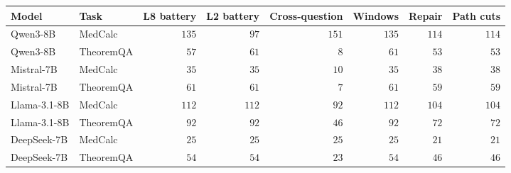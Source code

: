 \begin{tabular*}{\textwidth}{@{\extracolsep{\fill}}llrrrrrr@{}}
\toprule
Model & Task & L8 battery & L2 battery & Cross-question & Windows & Repair & Path cuts \\
\midrule
Qwen3-8B & MedCalc & $135$ & $97$ & $151$ & $135$ & $114$ & $114$ \\
Qwen3-8B & TheoremQA & $57$ & $61$ & $8$ & $61$ & $53$ & $53$ \\
Mistral-7B & MedCalc & $35$ & $35$ & $10$ & $35$ & $38$ & $38$ \\
Mistral-7B & TheoremQA & $61$ & $61$ & $7$ & $61$ & $59$ & $59$ \\
Llama-3.1-8B & MedCalc & $112$ & $112$ & $92$ & $112$ & $104$ & $104$ \\
Llama-3.1-8B & TheoremQA & $92$ & $92$ & $46$ & $92$ & $72$ & $72$ \\
DeepSeek-7B & MedCalc & $25$ & $25$ & $25$ & $25$ & $21$ & $21$ \\
DeepSeek-7B & TheoremQA & $54$ & $54$ & $23$ & $54$ & $46$ & $46$ \\
\bottomrule
\end{tabular*}
